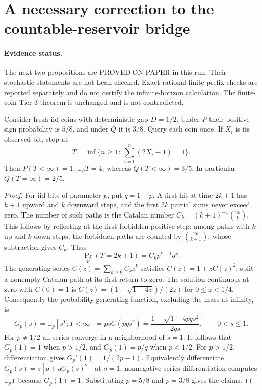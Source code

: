 \section{A necessary correction to the countable-reservoir bridge}
\paragraph{Evidence status.}
The next two propositions are PROVED-ON-PAPER in this run. Their stochastic
statements are not Lean-checked. Exact rational finite-prefix checks are reported
separately and do not certify the infinite-horizon calculation. The finite-coin
Tier 3 theorem is unchanged and is not contradicted.

\begin{proposition}
Consider fresh iid coins with deterministic gap $D=1/2$. Under $P$ their positive
sign probability is $5/8$, and under $Q$ it is $3/8$. Query each coin once. If
$X_i$ is its observed bit, stop at
\[
 T=\inf\{n\ge1:\ \textstyle\sum_{i=1}^n(2X_i-1)=1\}.
\]
Then $P(T<\infty)=1$, $\mathbb E_P T=4$, whereas
$Q(T<\infty)=3/5$. In particular $Q(T=\infty)=2/5$.
\end{proposition}
\begin{proof}
For iid bits of parameter $p$, put $q=1-p$. A first hit at time $2k+1$ has
$k+1$ upward and $k$ downward steps, and the first $2k$ partial sums never
exceed zero. The number of such paths is the Catalan number
$C_k=(k+1)^{-1}\binom{2k}{k}$. This follows by reflecting at the first
forbidden positive step: among paths with $k$ up and $k$ down steps, the
forbidden paths are counted by $\binom{2k}{k+1}$, whose subtraction gives
$C_k$. Thus
\[
 \Pr_p(T=2k+1)=C_kp^{k+1}q^k.
\]
The generating series $C(z)=\sum_{k\ge0}C_kz^k$ satisfies
$C(z)=1+zC(z)^2$: split a nonempty Catalan path at its first return to zero.
The solution continuous at zero with $C(0)=1$ is
$C(z)=(1-\sqrt{1-4z})/(2z)$ for $0\le z<1/4$.
Consequently the probability generating function, excluding the mass at
infinity, is
\[
 G_p(s)=\mathbb E_p[s^T;T<\infty]
       =psC(pqs^2)=\frac{1-\sqrt{1-4pqs^2}}{2qs},\qquad 0<s\le1.
\]
For $p\ne1/2$ all series converge in a neighborhood of $s=1$.
It follows that $G_p(1)=1$ when $p>1/2$, and $G_p(1)=p/q$ when $p<1/2$.
For $p>1/2$, differentiation gives $G_p'(1)=1/(2p-1)$.
Equivalently differentiate $G_p(s)=s[p+qG_p(s)^2]$ at $s=1$;
nonnegative-series differentiation computes $\mathbb E_pT$ because
$G_p(1)=1$. Substituting $p=5/8$ and $p=3/8$ gives the claims.
\end{proof}

